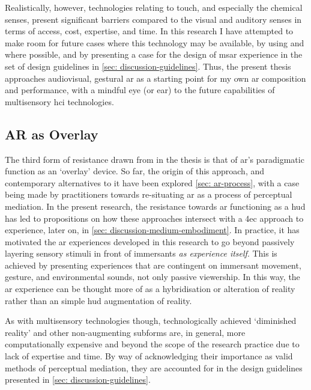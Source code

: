 Realistically, however, technologies relating to touch, and especially the chemical senses, present significant barriers compared to the visual and auditory senses in terms of access, cost, expertise, and time. In this research I have attempted to make room for future cases where this technology may be available, by using   and  where possible, and by presenting a case for the design of \gls{msar} experience in the set of design guidelines in \autoref{sec: discussion-guidelines}. Thus, the present thesis approaches audiovisual, gestural \gls{ar} as a starting point for my own \gls{ar} composition and performance, with a mindful eye (or ear) to the future capabilities of multisensory \gls{hci} technologies.

\subsection{AR as Overlay}\label{sec: method-resistance-overlay}
The third form of resistance drawn from in the thesis is that of \gls{ar}'s paradigmatic function as an `overlay' device. So far, the origin of this approach, and contemporary alternatives to it have been explored \autoref{sec: ar-process}, with a case being made by practitioners \citep{mann1994,schraffenberger2018,chevalier2020} towards re-situating \gls{ar} as a process of perceptual mediation. In the present research, the resistance towards \gls{ar} functioning as a \gls{hud} has led to propositions on how these approaches intersect with a \gls{4ec} approach to experience, later on, in \autoref{sec: discussion-medium-embodiment}. In practice, it has motivated the \gls{ar} experiences developed in this research to go beyond passively layering sensory stimuli in front of immersants \textit{as experience itself}. This is achieved by presenting experiences that are contingent on immersant movement, gesture, and environmental sounds, not only passive viewership. In this way, the \gls{ar} experience can be thought more of as a hybridisation or alteration of reality rather than an simple \gls{hud} augmentation of reality.

As with multisensory technologies though, technologically achieved `diminished reality' and other non-augmenting subforms are, in general, more computationally expensive and beyond the scope of the research practice due to lack of expertise and time. By way of acknowledging their importance as valid methods of perceptual mediation, they are accounted for in the design guidelines presented in \autoref{sec: discussion-guidelines}.



